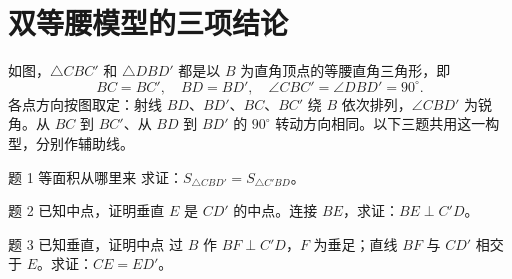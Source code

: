 \section{双等腰模型的三项结论}
如图，\(\triangle CBC'\) 和 \(\triangle DBD'\) 都是以 \(B\) 为直角顶点的等腰直角三角形，即
\[
BC=BC',\quad BD=BD',\quad
\angle CBC'=\angle DBD'=90^\circ.
\]
各点方向按图取定：射线 \(BD\)、\(BD'\)、\(BC\)、\(BC'\) 绕 \(B\) 依次排列，\(\angle CBD'\) 为锐角。从 \(BC\) 到 \(BC'\)、从 \(BD\) 到 \(BD'\) 的 \(90^\circ\) 转动方向相同。以下三题共用这一构型，分别作辅助线。
\diagram{\diModel}

\begin{problem}{题 1 等面积从哪里来}
求证：\(S_{\triangle CBD'}=S_{\triangle C'BD}\)。
\end{problem}

\begin{problem}{题 2 已知中点，证明垂直}
\(E\) 是 \(CD'\) 的中点。连接 \(BE\)，求证：\(BE\perp C'D\)。
\end{problem}

\begin{problem}{题 3 已知垂直，证明中点}
过 \(B\) 作 \(BF\perp C'D\)，\(F\) 为垂足；直线 \(BF\) 与 \(CD'\) 相交于 \(E\)。求证：\(CE=ED'\)。
\end{problem}
\clearpage
